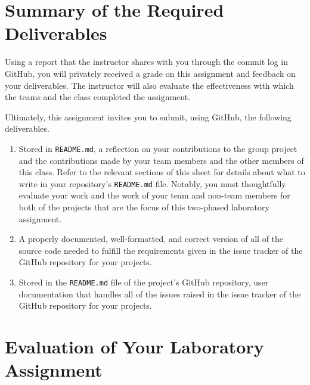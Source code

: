 \documentclass[11pt]{article}
\newcommand{\reflection}{\lstinline{README.md}}
\begin{document}
\section*{Summary of the Required Deliverables}

Using a report that the instructor shares with you through the commit log in GitHub, you will privately received a grade
on this assignment and feedback on your deliverables. The instructor will also evaluate the effectiveness with which the
teams and the class completed the assignment.

\vspace*{-.5em}


Ultimately, this assignment invites you to submit, using GitHub, the following deliverables.

\vspace*{-.5em}

\begin{enumerate}

\setlength{\itemsep}{0in}

\item Stored in \reflection{}, a reflection on your contributions to the group project and the contributions made by
  your team members and the other members of this class. Refer to the relevant sections of this sheet for details about
  what to write in your repository's \reflection{} file. Notably, you must thoughtfully evaluate your work and the work
  of your team and non-team members for both of the projects that are the focus of this two-phased laboratory assignment.

\item A properly documented, well-formatted, and correct version of all of the source code needed to fulfill the
  requirements given in the issue tracker of the GitHub repository for your projects.

\item Stored in the \reflection{} file of the project's GitHub repository, user documentation that handles all of the
  issues raised in the issue tracker of the GitHub repository for your projects.

\end{enumerate}

\vspace*{-1em}

\section*{Evaluation of Your Laboratory Assignment}
\end{document}
